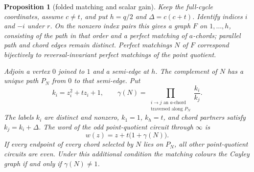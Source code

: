 \documentclass[11pt,a4paper]{article}
\newtheorem{proposition}[theorem]{Proposition}
\theoremstyle{definition}
\theoremstyle{remark}
\begin{document}
\begin{proposition}[folded matching and scalar gain]\label{prop:borel-gain}
Keep the full-cycle coordinates, assume $c\ne t$, and put $h=q/2$ and $\Delta=c(c+t)$.  Identify indices $i$ and $-i$ under $r$.  On the nonzero index pairs this gives a graph $F$ on $1,\ldots,h$, consisting of the path in that order and a perfect matching of $a$-chords; parallel path and chord edges remain distinct.  Perfect matchings $N$ of $F$ correspond bijectively to reversal-invariant perfect matchings of the point quotient.

Adjoin a vertex $0$ joined to $1$ and a semi-edge at $h$.  The complement of $N$ has a unique path $P_N$ from $0$ to that semi-edge.  Put
\[
 k_i=z_i^2+t z_i+1,\qquad
 \gamma(N)=\prod_{\substack{i\to j\text{ an }a\text{-chord}\\\text{traversed along }P_N}}
                \frac{k_i}{k_j}.
\]
The labels $k_i$ are distinct and nonzero, $k_1=1$, $k_h=t$, and chord partners satisfy $k_j=k_i+\Delta$.  The word of the odd point-quotient circuit through $\infty$ is
\[
                    w(z)=z+t\bigl(1+\gamma(N)\bigr).
\]
If every endpoint of every chord selected by $N$ lies on $P_N$, all other point-quotient circuits are even.  Under this additional condition the matching colours the Cayley graph if and only if $\gamma(N)\ne1$.
\end{proposition}
\end{document}
